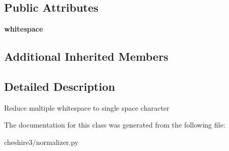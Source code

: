 \subsection*{Public Attributes}
\begin{DoxyCompactItemize}
\item 
\hypertarget{classcheshire3_1_1normalizer_1_1_space_normalizer_a5a62c3c1ff94e0750a7331d7f84873ae}{{\bfseries whitespace}}\label{classcheshire3_1_1normalizer_1_1_space_normalizer_a5a62c3c1ff94e0750a7331d7f84873ae}

\end{DoxyCompactItemize}
\subsection*{Additional Inherited Members}


\subsection{Detailed Description}
\begin{DoxyVerb}Reduce multiple whitespace to single space character \end{DoxyVerb}
 

The documentation for this class was generated from the following file\-:\begin{DoxyCompactItemize}
\item 
cheshire3/normalizer.\-py\end{DoxyCompactItemize}
